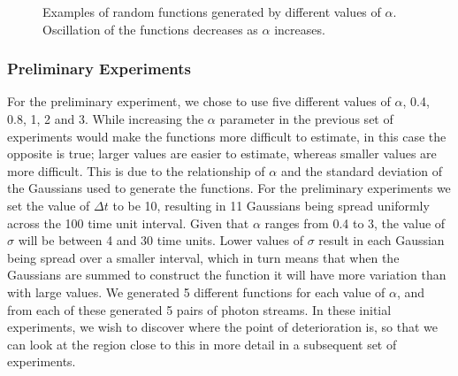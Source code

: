 \documentclass[a4paper,11pt]{article}
\begin{document}
\begin{center}
\begin{figure}
\begin{center}
{   }
   \end{center}
   \caption{Examples of random functions generated by different
   values of $\alpha$. Oscillation of the functions decreases as $\alpha$ increases.}
   \label{fig:randex}
   \end{figure}
   \end{center}
\subsubsection{Preliminary Experiments}
\label{sec-8-2-1}

    For the preliminary experiment, we chose to use five different values of
    $\alpha$, 0.4, 0.8, 1, 2 and 3. While increasing the $\alpha$ parameter in the
    previous set of experiments would make the functions more difficult to estimate,
    in this case the opposite is true; larger values are easier to estimate, whereas
    smaller values are more difficult. This is due to the relationship of $\alpha$
    and the standard deviation of the Gaussians used to generate the functions. For
    the preliminary experiments we set the value of $\Delta t$ to be 10, resulting
    in 11 Gaussians being spread uniformly across the 100 time unit interval. Given
    that $\alpha$ ranges from 0.4 to 3, the value of $\sigma$ will be between 4 and
    30 time units. Lower values of $\sigma$ result in each Gaussian being spread
    over a smaller interval, which in turn means that when the Gaussians are summed
    to construct the function it will have more variation than with large values. We
    generated 5 different functions for each value of $\alpha$, and from each of
    these generated 5 pairs of photon streams. In these initial experiments, we wish
    to discover where the point of deterioration is, so that we can look at the
    region close to this in more detail in a subsequent set of experiments.
\end{document}
